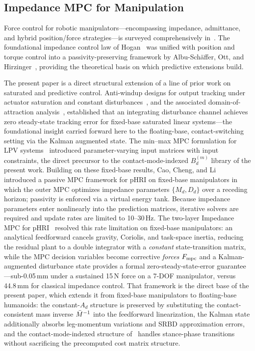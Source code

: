 \subsection{Impedance MPC for Manipulation}

Force control for robotic manipulators---encompassing impedance, admittance,
and hybrid position/force strategies---is surveyed comprehensively
in~\cite{villani2016force}.
The foundational impedance control law of Hogan~\cite{hogan1985impedance}
was unified with position and torque control into a passivity-preserving
framework by Albu-Sch\"{a}ffer, Ott, and
Hirzinger~\cite{albu2007unified}, providing the theoretical basis on which
predictive extensions build.

The present paper is a direct structural extension of a line of prior
work on saturated and predictive control.
Anti-windup designs for output tracking under actuator saturation and
constant disturbances~\cite{cao2004antiwindup}, and the associated
domain-of-attraction analysis~\cite{cao2002antiwindup}, established that an
integrating disturbance channel achieves zero steady-state tracking error
for fixed-base saturated linear systems---the foundational insight carried
forward here to the floating-base, contact-switching setting via the Kalman
augmented state.
The min--max MPC formulation for LPV systems~\cite{cao2005minmax} introduced
parameter-varying input matrices with input constraints, the direct
precursor to the contact-mode-indexed $B_d^{(m)}$ library of the present
work.
Building on these fixed-base results, Cao, Cheng, and
Li~\cite{cao2023passive} introduced a passive MPC framework for pHRI on
fixed-base manipulators in which the outer MPC optimizes impedance
parameters $\{M_d,D_d\}$ over a receding horizon; passivity is enforced via
a virtual energy tank.
Because impedance parameters enter nonlinearly into the prediction matrices,
iterative solvers are required and update rates are limited to 10--30\,Hz.
The two-layer Impedance MPC for pHRI~\cite{cao2026impedance} resolved this
rate limitation on fixed-base manipulators: an analytical feedforward
cancels gravity, Coriolis, and task-space inertia, reducing the residual
plant to a double integrator with a \emph{constant} state-transition
matrix, while the MPC decision variables become corrective \emph{forces}
$F_{\text{mpc}}$ and a Kalman-augmented disturbance state provides a formal
zero-steady-state-error guarantee---sub-0.05\,mm under a sustained 15\,N
force on a 7-DOF manipulator, versus 44.8\,mm for classical impedance
control.
That framework is the direct base of the present paper, which extends it
from fixed-base manipulators to floating-base humanoids: the constant-$A_d$
structure is preserved by substituting the contact-consistent mass inverse
$\bar{M}^{-1}$ into the feedforward linearization, the Kalman state additionally
absorbs leg-momentum variations and SRBD approximation errors, and the
contact-mode-indexed structure of~\cite{cao2005minmax} handles stance-phase
transitions without sacrificing the precomputed cost matrix structure.

